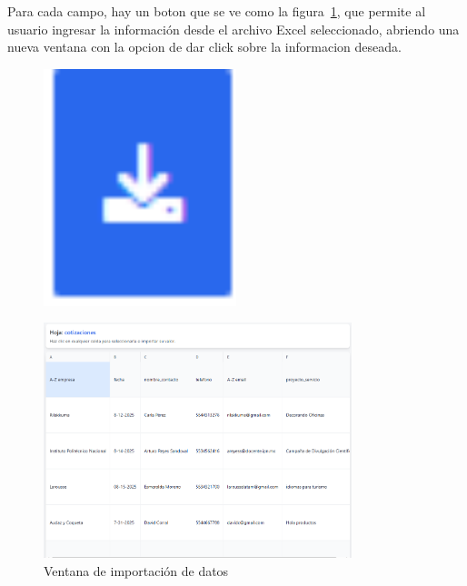 \documentclass{Pretexto/bluereport}
\begin{document}
\begin{minipage}{0.75\linewidth}
    Para cada campo, hay un boton que se ve como la figura~\ref{fig:importar_datos}, que permite al usuario ingresar la información
     desde el archivo Excel seleccionado, abriendo una nueva ventana con la opcion de 
     dar click sobre la informacion deseada.
\end{minipage}
\begin{minipage}{0.15\linewidth}
    \begin{figure}[H]
        \centering
        \includegraphics[width=0.5\textwidth]{img/boton_importacion.png}
        \caption{}\label{fig:importar_datos}
    \end{figure}
\end{minipage}




\begin{figure}[H]
    \centering
    \includegraphics[width=0.8\textwidth]{img/ventana_importacion.png}
    \caption{Ventana de importación de datos}
    \label{fig:ventana_importacion}
\end{figure}
\end{document}
